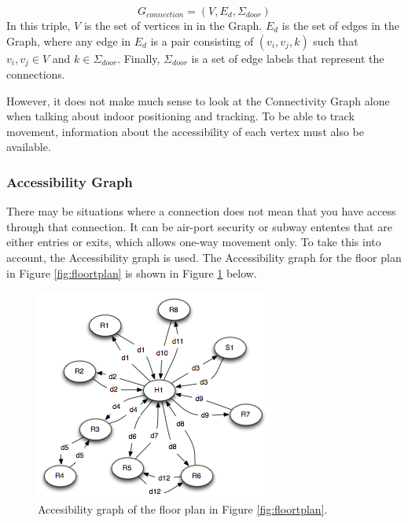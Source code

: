 \begin{equation}
G_{connection} = (V, E_d, \Sigma_{door})
\end{equation}
In this triple, $V$ is the set of vertices in in the Graph. 
$E_d$ is the set of edges in the Graph, where any edge in $E_d$ is a pair consisting of $({v_i, v_j}, k)$ such that $v_i, v_j \in V$ and $k \in \Sigma_{door}$.
Finally, $\Sigma_{door}$ is a set of edge labels that represent the connections. 

However, it does not make much sense to look at the Connectivity Graph alone when talking about indoor positioning and tracking. 
To be able to track movement, information about the accessibility of each vertex must also be available. 

\subsubsection{ \quad Accessibility Graph}
There may be situations where a connection does not mean that you have access through that connection.
It can be air-port security or subway ententes that are either entries or exits, which allows one-way movement only.
To take this into account, the Accessibility graph is used. 
The Accessibility graph for the floor plan in Figure \ref{fig:floortplan} is shown in Figure \ref{fig:accesibbilitygraph} below.

\begin{figure}[H]%
\includegraphics[width=\columnwidth]{images/accessibilitygraph.png}%
\caption{Accesibility graph of the floor plan in Figure \ref{fig:floortplan}.} %
\label{fig:accesibbilitygraph}%
\end{figure}%

